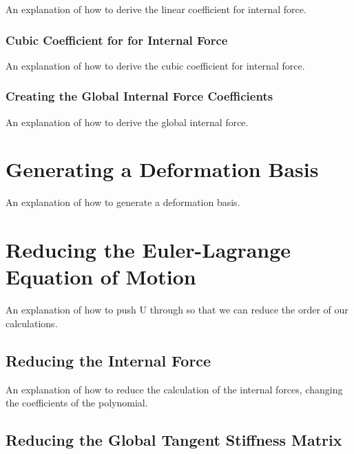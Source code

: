 \documentclass[twocolumn,10pt]{asme2ej}
\begin{document}
An explanation of how to derive the linear coefficient for internal force.

\subsubsection{Cubic Coefficient for for Internal Force}

An explanation of how to derive the cubic coefficient for internal force.

\subsubsection{Creating the Global Internal Force Coefficients}

An explanation of how to derive the global internal force.

\section{Generating a Deformation Basis}

An explanation of how to generate a deformation basis.

\section{Reducing the Euler-Lagrange Equation of Motion}

An explanation of how to push U through so that we can reduce the order of our calculations.

\subsection{Reducing the Internal Force}

An explanation of how to reduce the calculation of the internal forces, changing the coefficients
of the polynomial.

\subsection{Reducing the Global Tangent Stiffness Matrix}
\end{document}
